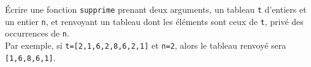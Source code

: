 Écrire une fonction \texttt{supprime} prenant deux arguments, un tableau
\texttt{t} d'entiers et un entier \texttt{n}, et renvoyant un tableau dont les
éléments sont ceux de \texttt{t}, privé des occurrences de \texttt{n}.\\
Par exemple, si \texttt{t=[2,1,6,2,8,6,2,1]} et \texttt{n=2}, alors le tableau
renvoyé sera \texttt{[1,6,8,6,1]}.